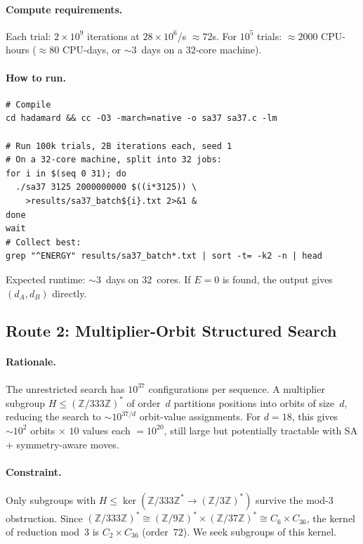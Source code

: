 \documentclass[11pt,a4paper]{article}
\newcommand{\Z}{\mathbb{Z}}
\theoremstyle{plain}
\theoremstyle{definition}
\theoremstyle{remark}
\begin{document}
\paragraph{Compute requirements.} Each trial: $2\times10^9$ iterations at $28\times10^6$/s $\approx72$s. For $10^5$ trials: $\approx2000$ CPU-hours ($\approx80$ CPU-days, or $\sim3$~days on a $32$-core machine).

\paragraph{How to run.}
\begin{lstlisting}
# Compile
cd hadamard && cc -O3 -march=native -o sa37 sa37.c -lm

# Run 100k trials, 2B iterations each, seed 1
# On a 32-core machine, split into 32 jobs:
for i in $(seq 0 31); do
  ./sa37 3125 2000000000 $((i*3125)) \
    >results/sa37_batch${i}.txt 2>&1 &
done
wait
# Collect best:
grep "^ENERGY" results/sa37_batch*.txt | sort -t= -k2 -n | head
\end{lstlisting}

Expected runtime: $\sim3$~days on 32~cores. If $E=0$ is found, the output gives $(d_A,d_B)$ directly.

\subsection{Route 2: Multiplier-Orbit Structured Search}
\label{sec:route2}

\paragraph{Rationale.} The unrestricted search has $10^{37}$ configurations per sequence. A multiplier subgroup $H\leq(\Z/333\Z)^*$ of order~$d$ partitions positions into orbits of size~$d$, reducing the search to $\sim10^{37/d}$ orbit-value assignments. For $d=18$, this gives $\sim10^{2}$ orbits $\times$ $10$ values each $=10^{20}$, still large but potentially tractable with SA + symmetry-aware moves.

\paragraph{Constraint.} Only subgroups with $H\leq\ker(\Z/333\Z^*\to(\Z/3\Z)^*)$ survive the mod-$3$ obstruction. Since $(\Z/333\Z)^*\cong(\Z/9\Z)^*\times(\Z/37\Z)^*\cong C_6\times C_{36}$, the kernel of reduction mod~$3$ is $C_2\times C_{36}$ (order~$72$). We seek subgroups of this kernel.
\end{document}
